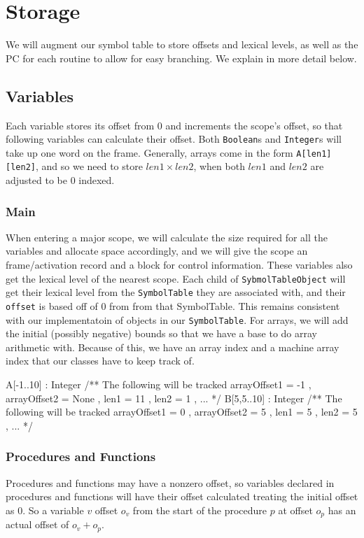 \section{Storage}
 We will augment our symbol table to store offsets and lexical levels, as well
 as the PC for each routine to allow for easy branching. We explain in more
 detail below.
\subsection{Variables}
 Each variable stores its offset from 0 and increments the scope's offset, so
 that following variables can calculate their offset. Both \texttt{Boolean}s and
 \texttt{Integer}s will take up one word on the frame. Generally, arrays come in
 the form \texttt{A[len1][len2]}, and so we need to store $len1 \times len2$,
 when both $len1$ and $len2$ are adjusted to be 0 indexed.
\subsubsection{Main}
  When entering a major scope, we will calculate the size required for all
  the variables and allocate space accordingly, and we will give the scope an
  frame/activation record and a block for control information. These variables
  also get the lexical level of the nearest scope. Each child of
  \texttt{SybmolTableObject} will get their lexical level from the
  \texttt{SymbolTable} they are associated with, and their \texttt{offset} is
  based off of 0 from from that SymbolTable. This remains consistent with our
  implementatoin of objects in our \texttt{SymbolTable}. For arrays, we will add
  the initial (possibly negative) bounds so that we have a base to do array
  arithmetic with.  Because of this, we have an array index and a machine array
  index that our classes have to keep track of.

  \begin{code}
    A[-1..10] : Integer
    /** The following will be tracked 
      { arrayOffset1 = -1
      , arrayOffset2 = None
      , len1 = 11 
      , len2 = 1
      , ...
      }
    */
    B[5,5..10] : Integer
    /** The following will be tracked 
      { arrayOffset1 = 0
      , arrayOffset2 = 5
      , len1 = 5
      , len2 = 5
      , ...
      }
    */
  \end{code}
  
\subsubsection{Procedures and Functions}
  Procedures and functions may have a nonzero offset, so variables declared in
  procedures and functions will have their offset calculated treating the
  initial offset as 0. So a variable $v$ offset $o_v$ from the start of the
  procedure $p$ at offset $o_p$ has an actual offset of $o_v + o_p$.
  
